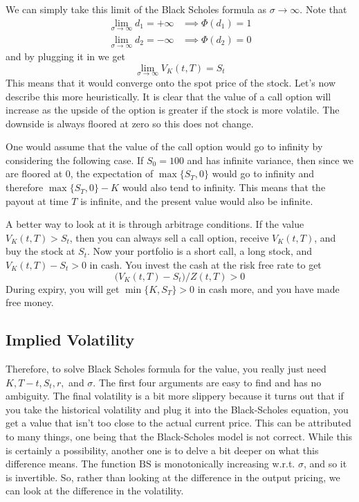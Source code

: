 \documentclass{article}
\begin{document}
    \begin{solution}
      We can simply take this limit of the Black Scholes formula as $\sigma \rightarrow \infty$. Note that 
      \begin{align}
        \lim_{\sigma \rightarrow \infty} d_1 = + \infty & \implies \Phi(d_1) = 1 \\ 
        \lim_{\sigma \rightarrow \infty} d_2 = - \infty & \implies \Phi(d_2) = 0
      \end{align}
      and by plugging it in we get 
      \begin{equation}
        \lim_{\sigma \rightarrow \infty} V_K (t, T) = S_t 
      \end{equation}
      This means that it would converge onto the spot price of the stock. Let's now describe this more heuristically. It is clear that the value of a call option will increase as the upside of the option is greater if the stock is more volatile. The downside is always floored at zero so this does not change. 

      One would assume that the value of the call option would go to infinity by considering the following case. If $S_0 = 100$ and has infinite variance, then since we are floored at $0$, the expectation of $\max\{S_T, 0\}$ would go to infinity and therefore $\max\{S_T, 0\} - K$ would also tend to infinity. This means that the payout at time $T$ is infinite, and the present value would also be infinite. 

      A better way to look at it is through arbitrage conditions. If the value $V_K (t, T) > S_t$, then you can always sell a call option, receive $V_K(t, T)$, and buy the stock at $S_t$. Now your portfolio is a short call, a long stock, and $V_K (t, T) - S_t > 0$ in cash. You invest the cash at the risk free rate to get 
      \begin{equation}
        \big( V_K (t, T) - S_t \big) / Z(t, T) > 0
      \end{equation}
      During expiry, you will get $\min\{K, S_T\} > 0$ in cash more, and you have made free money. 
    \end{solution}

  \subsection{Implied Volatility} 

    Therefore, to solve Black Scholes formula for the value, you really just need $K, T - t, S_t, r,$ and $\sigma$. The first four arguments are easy to find and has no ambiguity. The final volatility is a bit more slippery because it turns out that if you take the historical volatility and plug it into the Black-Scholes equation, you get a value that isn't too close to the actual current price. This can be attributed to many things, one being that the Black-Scholes model is not correct. While this is certainly a possibility, another one is to delve a bit deeper on what this difference means. The function $\mathrm{BS}$ is monotonically increasing w.r.t. $\sigma$, and so it is invertible. So, rather than looking at the difference in the output pricing, we can look at the difference in the volatility. 
\end{document}

